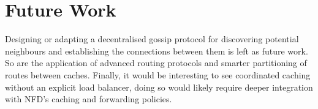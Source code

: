 \documentclass[letterpaper,12pt]{article}
\begin{document}
\section*{Future Work}
Designing or adapting a decentralised gossip protocol for discovering potential neighbours and establishing the connections between them is left as future work. So are the application of advanced routing protocols and smarter partitioning of routes between caches. Finally, it would be interesting to see coordinated caching without an explicit load balancer, doing so  would likely require deeper integration with NFD's caching and forwarding policies.



\printbibliography
\end{document}
